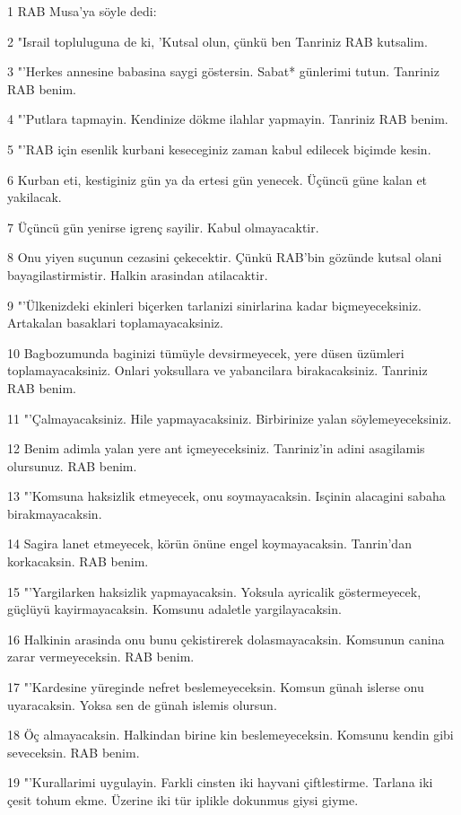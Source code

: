 \par 1 RAB Musa'ya söyle dedi:
\par 2 "Israil topluluguna de ki, 'Kutsal olun, çünkü ben Tanriniz RAB kutsalim.
\par 3 "'Herkes annesine babasina saygi göstersin. Sabat* günlerimi tutun. Tanriniz RAB benim.
\par 4 "'Putlara tapmayin. Kendinize dökme ilahlar yapmayin. Tanriniz RAB benim.
\par 5 "'RAB için esenlik kurbani keseceginiz zaman kabul edilecek biçimde kesin.
\par 6 Kurban eti, kestiginiz gün ya da ertesi gün yenecek. Üçüncü güne kalan et yakilacak.
\par 7 Üçüncü gün yenirse igrenç sayilir. Kabul olmayacaktir.
\par 8 Onu yiyen suçunun cezasini çekecektir. Çünkü RAB'bin gözünde kutsal olani bayagilastirmistir. Halkin arasindan atilacaktir.
\par 9 "'Ülkenizdeki ekinleri biçerken tarlanizi sinirlarina kadar biçmeyeceksiniz. Artakalan basaklari toplamayacaksiniz.
\par 10 Bagbozumunda baginizi tümüyle devsirmeyecek, yere düsen üzümleri toplamayacaksiniz. Onlari yoksullara ve yabancilara birakacaksiniz. Tanriniz RAB benim.
\par 11 "'Çalmayacaksiniz. Hile yapmayacaksiniz. Birbirinize yalan söylemeyeceksiniz.
\par 12 Benim adimla yalan yere ant içmeyeceksiniz. Tanriniz'in adini asagilamis olursunuz. RAB benim.
\par 13 "'Komsuna haksizlik etmeyecek, onu soymayacaksin. Isçinin alacagini sabaha birakmayacaksin.
\par 14 Sagira lanet etmeyecek, körün önüne engel koymayacaksin. Tanrin'dan korkacaksin. RAB benim.
\par 15 "'Yargilarken haksizlik yapmayacaksin. Yoksula ayricalik göstermeyecek, güçlüyü kayirmayacaksin. Komsunu adaletle yargilayacaksin.
\par 16 Halkinin arasinda onu bunu çekistirerek dolasmayacaksin. Komsunun canina zarar vermeyeceksin. RAB benim.
\par 17 "'Kardesine yüreginde nefret beslemeyeceksin. Komsun günah islerse onu uyaracaksin. Yoksa sen de günah islemis olursun.
\par 18 Öç almayacaksin. Halkindan birine kin beslemeyeceksin. Komsunu kendin gibi seveceksin. RAB benim.
\par 19 "'Kurallarimi uygulayin. Farkli cinsten iki hayvani çiftlestirme. Tarlana iki çesit tohum ekme. Üzerine iki tür iplikle dokunmus giysi giyme.
